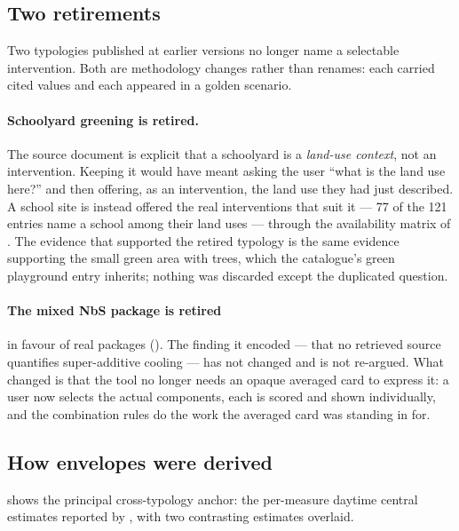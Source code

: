\subsection{Two retirements}
\label{sec:retirements}

Two typologies published at earlier versions no longer name a selectable
intervention. Both are methodology changes rather than renames: each carried
cited values and each appeared in a golden scenario.

\paragraph{Schoolyard greening is retired.} The source document is explicit
that a schoolyard is a \emph{land-use context}, not an intervention. Keeping it
would have meant asking the user ``what is the land use here?'' and then
offering, as an intervention, the land use they had just described. A school
site is instead offered the real interventions that suit it --- \num{77} of the
\num{121} entries name a school among their land uses --- through the
availability matrix of . The evidence that supported
the retired typology is the same evidence supporting the small green area with
trees, which the catalogue's green playground entry inherits; nothing was
discarded except the duplicated question.

\paragraph{The mixed NbS package is retired} in favour of real packages
(). The finding it encoded --- that no retrieved source
quantifies super-additive cooling --- has not changed and is not re-argued.
What changed is that the tool no longer needs an opaque averaged card to
express it: a user now selects the actual components, each is scored and shown
individually, and the combination rules do the work the averaged card was
standing in for.

\subsection{How envelopes were derived}
\label{sec:derivation}

 shows the principal cross-typology anchor: the
per-measure daytime central estimates reported by \textcite{keravec2026}, with
two contrasting estimates overlaid.

